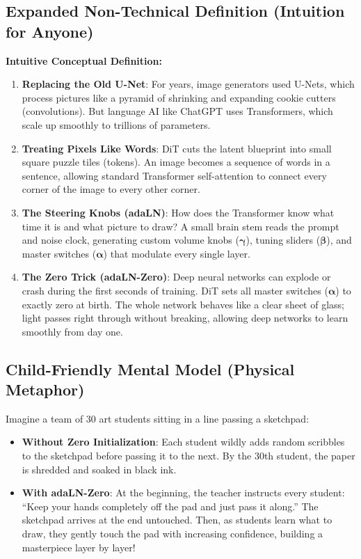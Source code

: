 \documentclass[11pt,a4paper]{article}
\theoremstyle{definition}
\begin{document}
\subsection{Expanded Non-Technical Definition (Intuition for Anyone)}
\textbf{Intuitive Conceptual Definition:}
\begin{enumerate}
    \item \textbf{Replacing the Old U-Net}: For years, image generators used U-Nets, which process pictures like a pyramid of shrinking and expanding cookie cutters (convolutions). But language AI like ChatGPT uses Transformers, which scale up smoothly to trillions of parameters.
    \item \textbf{Treating Pixels Like Words}: DiT cuts the latent blueprint into small square puzzle tiles (tokens). An image becomes a sequence of words in a sentence, allowing standard Transformer self-attention to connect every corner of the image to every other corner.
    \item \textbf{The Steering Knobs (adaLN)}: How does the Transformer know what time it is and what picture to draw? A small brain stem reads the prompt and noise clock, generating custom volume knobs ($\boldsymbol{\gamma}$), tuning sliders ($\boldsymbol{\beta}$), and master switches ($\boldsymbol{\alpha}$) that modulate every single layer.
    \item \textbf{The Zero Trick (adaLN-Zero)}: Deep neural networks can explode or crash during the first seconds of training. DiT sets all master switches ($\boldsymbol{\alpha}$) to exactly zero at birth. The whole network behaves like a clear sheet of glass; light passes right through without breaking, allowing deep networks to learn smoothly from day one.
\end{enumerate}

\subsection{Child-Friendly Mental Model (Physical Metaphor)}
Imagine a team of 30 art students sitting in a line passing a sketchpad:
\begin{itemize}
    \item \textbf{Without Zero Initialization}: Each student wildly adds random scribbles to the sketchpad before passing it to the next. By the 30th student, the paper is shredded and soaked in black ink.
    \item \textbf{With adaLN-Zero}: At the beginning, the teacher instructs every student: ``Keep your hands completely off the pad and just pass it along.'' The sketchpad arrives at the end untouched. Then, as students learn what to draw, they gently touch the pad with increasing confidence, building a masterpiece layer by layer!
\end{itemize}
\end{document}
